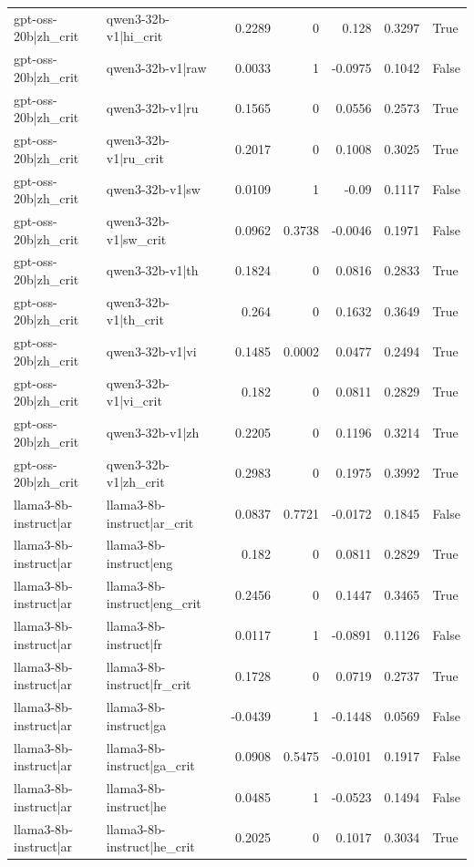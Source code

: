 \begin{table}
\begin{tabular}{l l r r r r l}
gpt-oss-20b|zh_crit & qwen3-32b-v1|hi_crit & 0.2289 & 0 & 0.128 & 0.3297 & True \\
gpt-oss-20b|zh_crit & qwen3-32b-v1|raw & 0.0033 & 1 & -0.0975 & 0.1042 & False \\
gpt-oss-20b|zh_crit & qwen3-32b-v1|ru & 0.1565 & 0 & 0.0556 & 0.2573 & True \\
gpt-oss-20b|zh_crit & qwen3-32b-v1|ru_crit & 0.2017 & 0 & 0.1008 & 0.3025 & True \\
gpt-oss-20b|zh_crit & qwen3-32b-v1|sw & 0.0109 & 1 & -0.09 & 0.1117 & False \\
gpt-oss-20b|zh_crit & qwen3-32b-v1|sw_crit & 0.0962 & 0.3738 & -0.0046 & 0.1971 & False \\
gpt-oss-20b|zh_crit & qwen3-32b-v1|th & 0.1824 & 0 & 0.0816 & 0.2833 & True \\
gpt-oss-20b|zh_crit & qwen3-32b-v1|th_crit & 0.264 & 0 & 0.1632 & 0.3649 & True \\
gpt-oss-20b|zh_crit & qwen3-32b-v1|vi & 0.1485 & 0.0002 & 0.0477 & 0.2494 & True \\
gpt-oss-20b|zh_crit & qwen3-32b-v1|vi_crit & 0.182 & 0 & 0.0811 & 0.2829 & True \\
gpt-oss-20b|zh_crit & qwen3-32b-v1|zh & 0.2205 & 0 & 0.1196 & 0.3214 & True \\
gpt-oss-20b|zh_crit & qwen3-32b-v1|zh_crit & 0.2983 & 0 & 0.1975 & 0.3992 & True \\
llama3-8b-instruct|ar & llama3-8b-instruct|ar_crit & 0.0837 & 0.7721 & -0.0172 & 0.1845 & False \\
llama3-8b-instruct|ar & llama3-8b-instruct|eng & 0.182 & 0 & 0.0811 & 0.2829 & True \\
llama3-8b-instruct|ar & llama3-8b-instruct|eng_crit & 0.2456 & 0 & 0.1447 & 0.3465 & True \\
llama3-8b-instruct|ar & llama3-8b-instruct|fr & 0.0117 & 1 & -0.0891 & 0.1126 & False \\
llama3-8b-instruct|ar & llama3-8b-instruct|fr_crit & 0.1728 & 0 & 0.0719 & 0.2737 & True \\
llama3-8b-instruct|ar & llama3-8b-instruct|ga & -0.0439 & 1 & -0.1448 & 0.0569 & False \\
llama3-8b-instruct|ar & llama3-8b-instruct|ga_crit & 0.0908 & 0.5475 & -0.0101 & 0.1917 & False \\
llama3-8b-instruct|ar & llama3-8b-instruct|he & 0.0485 & 1 & -0.0523 & 0.1494 & False \\
llama3-8b-instruct|ar & llama3-8b-instruct|he_crit & 0.2025 & 0 & 0.1017 & 0.3034 & True \\

\end{tabular}
\end{table}
